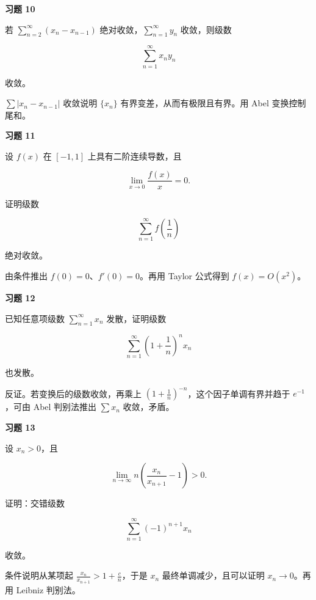 \begin{exercisebox}
\textbf{习题 10 }

若 \(\sum_{n=2}^{\infty}(x_n-x_{n-1})\) 绝对收敛，\(\sum_{n=1}^{\infty}y_n\) 收敛，则级数

\[
      \sum_{n=1}^{\infty}x_ny_n
      \]

收敛。

\begin{hintbox}
\(\sum |x_n-x_{n-1}|\) 收敛说明 \(\{x_n\}\) 有界变差，从而有极限且有界。用 Abel 变换控制尾和。
\end{hintbox}
\end{exercisebox}

\begin{exercisebox}
\textbf{习题 11 }

设 \(f(x)\) 在 \([-1,1]\) 上具有二阶连续导数，且

\[
      \lim_{x\to0}\frac{f(x)}{x}=0.
      \]

证明级数

\[
      \sum_{n=1}^{\infty}f\left(\frac1n\right)
      \]

绝对收敛。

\begin{hintbox}
由条件推出 \(f(0)=0\)、\(f'(0)=0\)。再用 Taylor 公式得到 \(f(x)=O(x^2)\)。
\end{hintbox}
\end{exercisebox}

\begin{exercisebox}
\textbf{习题 12 }

已知任意项级数 \(\sum_{n=1}^{\infty}x_n\) 发散，证明级数

\[
      \sum_{n=1}^{\infty}\left(1+\frac1n\right)^nx_n
      \]

也发散。

\begin{hintbox}
反证。若变换后的级数收敛，再乘上 \(\left(1+\frac1n\right)^{-n}\)，这个因子单调有界并趋于 \(e^{-1}\)，可由 Abel 判别法推出 \(\sum x_n\) 收敛，矛盾。
\end{hintbox}
\end{exercisebox}

\begin{exercisebox}
\textbf{习题 13 }

设 \(x_n>0\)，且

\[
      \lim_{n\to\infty}n\left(\frac{x_n}{x_{n+1}}-1\right)>0.
      \]

证明：交错级数

\[
      \sum_{n=1}^{\infty}(-1)^{n+1}x_n
      \]

收敛。

\begin{hintbox}
条件说明从某项起 \(\frac{x_n}{x_{n+1}}>1+\frac{c}{n}\)，于是 \(x_n\) 最终单调减少，且可以证明 \(x_n\to0\)。再用 Leibniz 判别法。
\end{hintbox}
\end{exercisebox}

